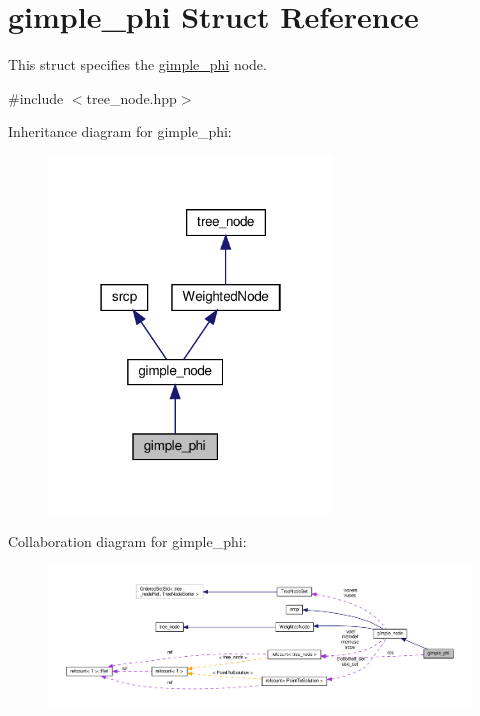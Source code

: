 \hypertarget{structgimple__phi}{}\section{gimple\+\_\+phi Struct Reference}
\label{structgimple__phi}


This struct specifies the \hyperlink{structgimple__phi}{gimple\+\_\+phi} node.  




{\ttfamily \#include $<$tree\+\_\+node.\+hpp$>$}



Inheritance diagram for gimple\+\_\+phi\+:
\nopagebreak
\begin{figure}[H]
\begin{center}
\leavevmode
\includegraphics[width=214pt]{d1/d7d/structgimple__phi__inherit__graph}
\end{center}
\end{figure}


Collaboration diagram for gimple\+\_\+phi\+:
\nopagebreak
\begin{figure}[H]
\begin{center}
\leavevmode
\includegraphics[width=350pt]{df/d35/structgimple__phi__coll__graph}
\end{center}
\end{figure}
